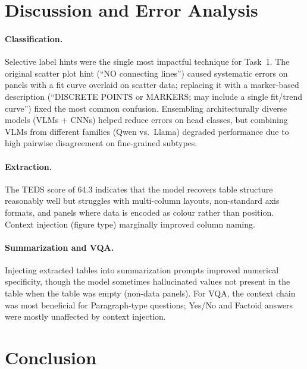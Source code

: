 \documentclass[11pt]{tibop-article}
\begin{document}
\section{Discussion and Error Analysis}

\paragraph{Classification.}
Selective label hints were the single most impactful technique for Task~1.
The original scatter plot hint (``NO connecting lines'') caused systematic
errors on panels with a fit curve overlaid on scatter data; replacing it with
a marker-based description (``DISCRETE POINTS or MARKERS; may include a single
fit/trend curve'') fixed the most common confusion.
Ensembling architecturally diverse models (VLMs + CNNs) helped reduce errors on
head classes, but combining VLMs from different families (Qwen vs.\ Llama)
degraded performance due to high pairwise disagreement on fine-grained subtypes.

\paragraph{Extraction.}
The TEDS score of 64.3 indicates that the model recovers table structure
reasonably well but struggles with multi-column layouts, non-standard axis
formats, and panels where data is encoded as colour rather than position.
Context injection (figure type) marginally improved column naming.

\paragraph{Summarization and VQA.}
Injecting extracted tables into summarization prompts improved numerical
specificity, though the model sometimes hallucinated values not present in the
table when the table was empty (non-data panels).
For VQA, the context chain was most beneficial for Paragraph-type questions;
Yes/No and Factoid answers were mostly unaffected by context injection.


\section{Conclusion}
\end{document}
